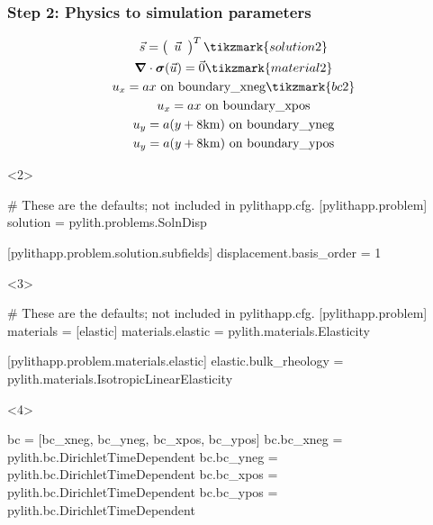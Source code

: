 \documentclass[aspectratio=169]{beamer}
\begin{document}
\begin{frame}[t,fragile]
  \frametitle{Step 2: Physics to simulation parameters}
  \summary{}

  \begin{minipage}[t]{0.35\textwidth}
    {\scriptsize
    \begin{gather*}
      \vec{s} = \left(\begin{array}{c} \vec{u} \end{array}\right)^T \tikzmark{solution2}\\
      \boldsymbol{\nabla} \cdot \boldsymbol{\sigma}(\vec{u}) = \vec{0} \tikzmark{material2}\\
      u_x = ax \text{ on boundary\_xneg} \tikzmark{bc2}\\
      u_x = ax \text{ on boundary\_xpos} \\
      u_y = a(y+8\mathrm{km}) \text{ on boundary\_yneg} \\
      u_y = a(y+8\mathrm{km}) \text{ on boundary\_ypos}
    \end{gather*}}
  \end{minipage}
  \hfill
  \begin{minipage}[t]{0.60\textwidth}
    \begin{onlyenv}<2>
      \begin{cfgcode}
        # These are the defaults; not included in pylithapp.cfg.
        [pylithapp.problem]
        solution = pylith.problems.SolnDisp
        
        [pylithapp.problem.solution.subfields]
        displacement.basis_order = 1
      \end{cfgcode}
    \end{onlyenv}
    \begin{onlyenv}<3>
      \begin{cfgcode}
        # These are the defaults; not included in pylithapp.cfg.
        [pylithapp.problem]
        materials = [elastic]
        materials.elastic = pylith.materials.Elasticity

        [pylithapp.problem.materials.elastic]
        elastic.bulk_rheology = pylith.materials.IsotropicLinearElasticity
      \end{cfgcode}
    \end{onlyenv}
    \begin{onlyenv}<4>
      \begin{cfgcode}
        bc = [bc_xneg, bc_yneg, bc_xpos, bc_ypos]
        bc.bc_xneg = pylith.bc.DirichletTimeDependent
        bc.bc_yneg = pylith.bc.DirichletTimeDependent
        bc.bc_xpos = pylith.bc.DirichletTimeDependent
        bc.bc_ypos = pylith.bc.DirichletTimeDependent
        

\end{cfgcode}
\end{onlyenv}
\end{minipage}
\end{frame}
\end{document}
